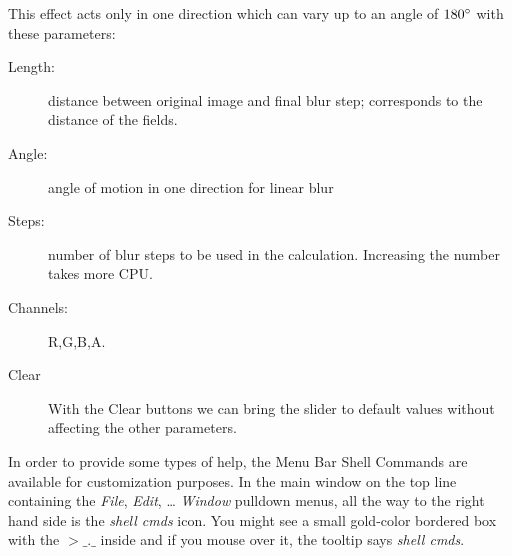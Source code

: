 \documentclass[10pt]{article}
\begin{document}
This effect acts only in one direction which can vary up to an angle
of $180\degree$ with these parameters:

\begin{description}
\item[Length:] distance between original image and final blur step;
  corresponds to the distance of the fields.
\item[Angle:] angle of motion in one direction for linear blur
\item[Steps:] number of blur steps to be used in the calculation.
  Increasing the number takes more CPU.
\item[Channels:] R,G,B,A.
\item[Clear] With the Clear buttons we can bring the slider to default
  values without affecting the other parameters.
\end{description}

In order to provide some types of help, the Menu Bar Shell Commands
are available for customization purposes. In the main window on the
top line containing the \textit{File}, \textit{Edit}, {\dots}
\textit{Window} pulldown menus, all the way to the right hand side is
the \textit{shell cmds} icon. You might see a small gold-color
bordered box with the $>\_.\_$ inside and if you mouse over it, the
tooltip says \textit{shell cmds}.
\end{document}
